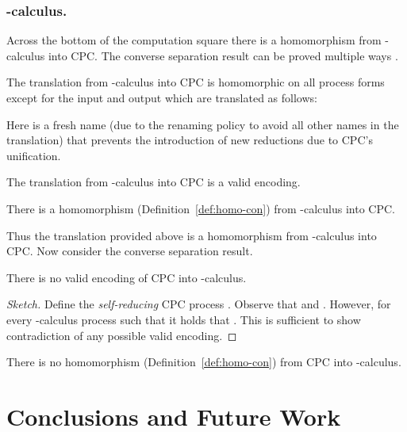 \documentclass{llncs}
\begin{document}
\subsubsection*{-calculus.}
\label{subsec:pi}


Across the bottom of the computation square there is a homomorphism from -calculus into CPC.
The converse separation result can be proved multiple ways \cite{GivenWilsonGorlaJay10,GivenWilsonPHD,givenwilson:hal-00987578}.


The translation  from -calculus into CPC is homomorphic on all process forms except for the input and output which are translated as follows:

Here  is a fresh name (due to the renaming policy to avoid all other
names in the translation) that prevents the introduction of new reductions due to CPC's unification.

\begin{lemma}
\label{lem:pi2cpc-valid}
The translation  from -calculus into CPC is a valid encoding.
\end{lemma}

\begin{theorem}
\label{thm:pi2cpc-hom}
There is a homomorphism (Definition~\ref{def:homo-con}) from -calculus into CPC.
\end{theorem}

Thus the translation provided above is a homomorphism from -calculus into CPC.
Now consider the converse separation result.

\begin{lemma}
\label{lem:nocpc2pi-1}
There is no valid encoding of CPC into -calculus.
\end{lemma}
\begin{proof}[Sketch]
Define the {\em self-reducing} CPC process .
Observe that  and .
However, for every -calculus process  such that  it holds that .
This is sufficient to show contradiction of any possible valid encoding.
\end{proof}

\begin{theorem}
\label{thm:noCPC2pi}
There is no homomorphism (Definition~\ref{def:homo-con}) from CPC into -calculus.
\end{theorem}




\section{Conclusions and Future Work}
\label{sec:conclusions}
\end{document}

